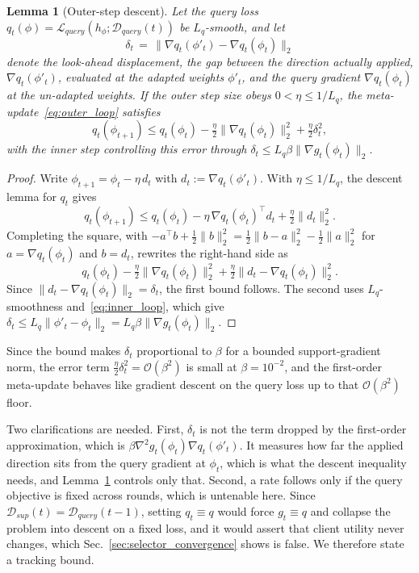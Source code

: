 \documentclass[journal]{IEEEtran}
\newtheorem{Lemma}{Lemma}
\theoremstyle{remark}
\newcommand{\revtwo}[1]{#1}
\begin{document}
{\color{black}
\begin{Lemma}[Outer-step descent]\label{stmt:outer}
Let the query loss $q_t(\phi)=\mathcal{L}_{query}(h_\phi;\mathcal{D}_{query}(t))$ be $L_q$-smooth, and let
\[
\delta_t\,=\,\lVert\nabla q_t(\phi'_t)-\nabla q_t(\phi_t)\rVert_2
\]
denote the \revtwo{\emph{look-ahead displacement}}, the gap between the direction actually applied, $\nabla q_t(\phi'_t)$, evaluated at the adapted weights $\phi'_t$, and the query gradient $\nabla q_t(\phi_t)$ at the un-adapted weights. If the outer step size obeys $0<\eta\le 1/L_q$, the meta-update~\eqref{eq:outer_loop} satisfies
\[
q_t(\phi_{t+1})\le q_t(\phi_t)-\tfrac{\eta}{2}\lVert\nabla q_t(\phi_t)\rVert_2^2+\tfrac{\eta}{2}\delta_t^2 ,
\]
with the inner step controlling this error through $\delta_t\le L_q\beta\lVert\nabla g_t(\phi_t)\rVert_2$.
\end{Lemma}
\begin{proof}
Write $\phi_{t+1}=\phi_t-\eta\,d_t$ with $d_t:=\nabla q_t(\phi'_t)$. With $\eta\le 1/L_q$, the descent lemma for $q_t$ gives
\[
q_t(\phi_{t+1})\le q_t(\phi_t)-\eta\,\nabla q_t(\phi_t)^{\top}d_t+\tfrac{\eta}{2}\lVert d_t\rVert_2^2 .
\]
Completing the square, with $-a^{\top}b+\tfrac12\lVert b\rVert_2^2=\tfrac12\lVert b-a\rVert_2^2-\tfrac12\lVert a\rVert_2^2$ for $a=\nabla q_t(\phi_t)$ and $b=d_t$, rewrites the right-hand side as
\[
q_t(\phi_t)-\tfrac{\eta}{2}\lVert\nabla q_t(\phi_t)\rVert_2^2+\tfrac{\eta}{2}\lVert d_t-\nabla q_t(\phi_t)\rVert_2^2 .
\]
Since $\lVert d_t-\nabla q_t(\phi_t)\rVert_2=\delta_t$, the first bound follows. The second uses $L_q$-smoothness and~\eqref{eq:inner_loop}, which give $\delta_t\le L_q\lVert\phi'_t-\phi_t\rVert_2=L_q\beta\lVert\nabla g_t(\phi_t)\rVert_2$.
\end{proof}
Since the bound makes $\delta_t$ proportional to $\beta$ for a bounded support-gradient norm, the error term $\tfrac{\eta}{2}\delta_t^2=\mathcal{O}(\beta^2)$ is \revtwo{small} at $\beta=10^{-2}$, and the first-order meta-update behaves like \revtwo{gradient descent on the query loss up to that $\mathcal{O}(\beta^2)$ floor}.

\revtwo{Two clarifications are needed. First, $\delta_t$ is not the term dropped by the first-order approximation, which is $\beta\nabla^2 g_t(\phi_t)\nabla q_t(\phi'_t)$. It measures how far the applied direction sits from the query gradient at $\phi_t$, which is what the descent inequality needs, and Lemma~\ref{stmt:outer} controls only that. Second, a rate follows only if the query objective is fixed across rounds, which is untenable here. Since $\mathcal{D}_{sup}(t)=\mathcal{D}_{query}(t-1)$, setting $q_t\equiv q$ would force $g_t\equiv q$ and collapse the problem into descent on a fixed loss, and it would assert that client utility never changes, which Sec.~\ref{sec:selector_convergence} shows is false. We therefore state a tracking bound.}

}
\end{document}
